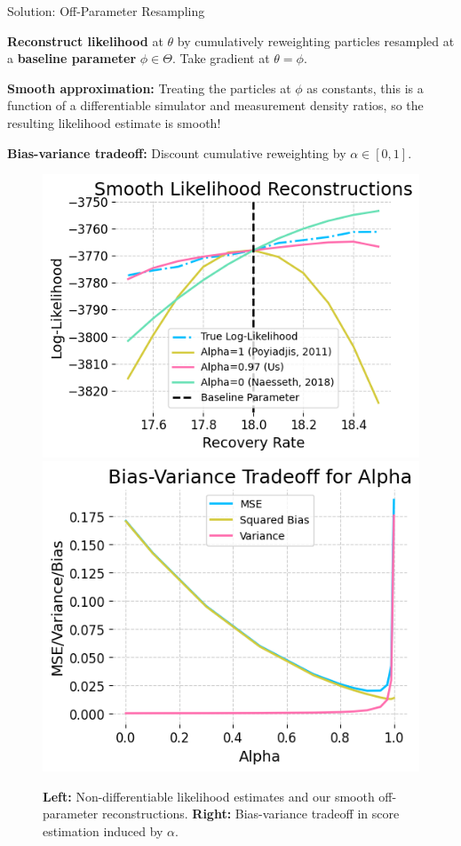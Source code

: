 \documentclass[final]{beamer}
\newlength{\colwidth}
\begin{document}
\begin{frame}[t]
\begin{columns}[t]
\begin{column}{\colwidth}
  \begin{alertblock}{Solution: Off-Parameter Resampling}

    \textbf{Reconstruct likelihood} at $\theta$ by cumulatively reweighting particles resampled at a \textbf{baseline parameter} $\phi \in \Theta$. Take gradient at $\theta=\phi$.

    \textbf{Smooth approximation:} Treating the particles at $\phi$ as constants, this is a function of a differentiable simulator and measurement density ratios, so the resulting likelihood estimate is smooth!

    \textbf{Bias-variance tradeoff:} Discount cumulative reweighting by $\alpha \in [0,1]$.

  \end{alertblock}

  \vspace{1ex}
    \begin{figure}
        \centering
        \includegraphics[width=0.52\linewidth]{imgs/095/mop.png}
        \includegraphics[width=0.472\linewidth]{imgs/095/biasvar.png}
        \caption{\textbf{Left:} Non-differentiable likelihood estimates and our smooth off-parameter reconstructions. 
        \textbf{Right:} Bias-variance tradeoff in score estimation induced by $\alpha$.}
        \label{fig:enter-label}
    \end{figure}
    


\end{column}
\end{columns}
\end{frame}
\end{document}
